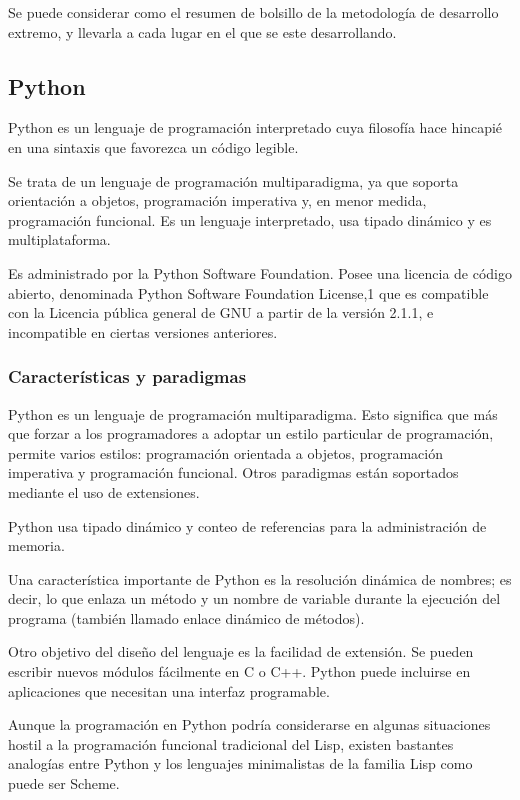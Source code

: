 \documentclass[12pt]{article} %
\begin{document}
			Se puede considerar como el resumen de bolsillo de la metodología de desarrollo extremo, y llevarla a cada lugar en el que se este desarrollando.\\
	
	
	\subsection{Python \label{python}}
		Python es un lenguaje de programación interpretado cuya filosofía hace hincapié en una sintaxis que favorezca un código legible.

		Se trata de un lenguaje de programación multiparadigma, ya que soporta orientación a objetos, programación imperativa y, en menor medida, programación funcional. 
		Es un lenguaje interpretado, usa tipado dinámico y es multiplataforma.
		
		Es administrado por la Python Software Foundation. Posee una licencia de código abierto, denominada Python Software Foundation License,1 que es compatible con 
		la Licencia pública general de GNU a partir de la versión 2.1.1, e incompatible en ciertas versiones anteriores.
		
		\subsubsection{Características y paradigmas}
			Python es un lenguaje de programación multiparadigma. Esto significa que más que forzar a los programadores a adoptar un estilo particular de programación, 
			permite varios estilos: programación orientada a objetos, programación imperativa y programación funcional. Otros paradigmas están soportados mediante el uso 
			de  extensiones. 
			
			Python usa tipado dinámico y conteo de referencias para la administración de memoria. 
			
			Una característica importante de Python es la resolución dinámica de nombres; es decir, lo que enlaza un método y un nombre de variable durante la ejecución del
     		programa (también llamado enlace dinámico de métodos).
     		
     		Otro objetivo del diseño del lenguaje es la facilidad de extensión. Se pueden escribir nuevos módulos fácilmente en C o C++. Python puede incluirse en aplicaciones
     		que necesitan una interfaz programable.
     	
     		Aunque la programación en Python podría considerarse en algunas situaciones hostil a la programación funcional tradicional del Lisp, existen bastantes analogías 
     		entre Python y los lenguajes minimalistas de la familia Lisp como puede ser Scheme.
     		
\end{document}

